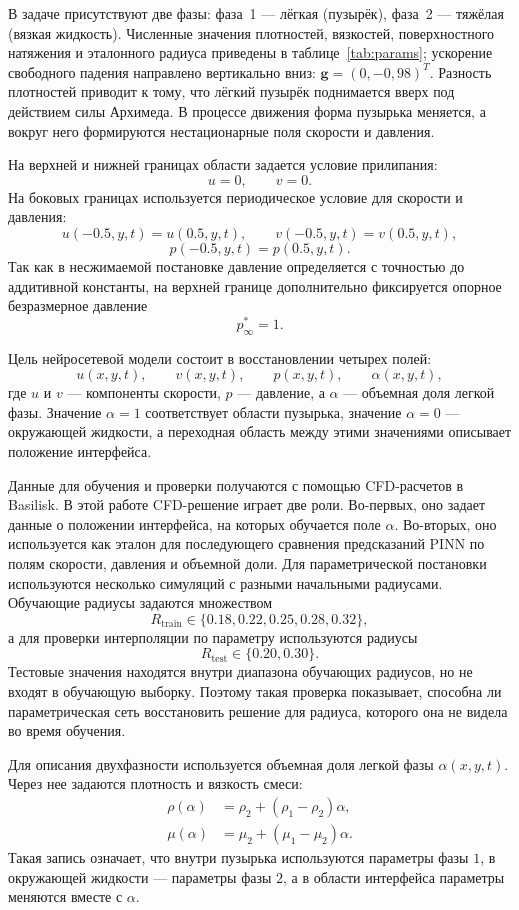 \documentclass[12pt,a4paper]{article}
\begin{document}
В задаче присутствуют две фазы: фаза~1 --- лёгкая (пузырёк), фаза~2 --- тяжёлая
(вязкая жидкость). Численные значения плотностей, вязкостей, поверхностного
натяжения и эталонного радиуса приведены в таблице~\ref{tab:params};
ускорение свободного падения направлено вертикально вниз:
$\mathbf{g}=(0,{-}0{,}98)^T$.
Разность плотностей приводит к тому, что лёгкий пузырёк поднимается вверх под
действием силы Архимеда. В процессе движения форма пузырька меняется, а вокруг
него формируются нестационарные поля скорости и давления.

На верхней и нижней границах области задается условие прилипания:
\[
    u=0,\qquad v=0.
\]
На боковых границах используется периодическое условие для скорости и давления:
\[
    u(-0.5,y,t)=u(0.5,y,t),
    \qquad
    v(-0.5,y,t)=v(0.5,y,t),
\]
\[
    p(-0.5,y,t)=p(0.5,y,t).
\]
Так как в несжимаемой постановке давление определяется с точностью до
аддитивной константы, на верхней границе дополнительно фиксируется опорное
безразмерное давление
\[
    p_\infty^*=1.
\]

Цель нейросетевой модели состоит в восстановлении четырех полей:
\[
    u(x,y,t),\qquad v(x,y,t),\qquad p(x,y,t),\qquad \alpha(x,y,t),
\]
где \(u\) и \(v\) --- компоненты скорости, \(p\) --- давление, а \(\alpha\) ---
объемная доля легкой фазы. Значение \(\alpha=1\) соответствует области
пузырька, значение \(\alpha=0\) --- окружающей жидкости, а переходная область
между этими значениями описывает положение интерфейса.

Данные для обучения и проверки получаются с помощью CFD-расчетов в Basilisk.
В этой работе CFD-решение играет две роли. Во-первых, оно задает данные о
положении интерфейса, на которых обучается поле \(\alpha\). Во-вторых, оно
используется как эталон для последующего сравнения предсказаний PINN по полям
скорости, давления и объемной доли. Для параметрической постановки используются
несколько симуляций с разными начальными радиусами. Обучающие радиусы задаются
множеством
\[
    R_{\mathrm{train}}\in\{0.18,0.22,0.25,0.28,0.32\},
\]
а для проверки интерполяции по параметру используются радиусы
\[
    R_{\mathrm{test}}\in\{0.20,0.30\}.
\]
Тестовые значения находятся внутри диапазона обучающих радиусов, но не входят в
обучающую выборку. Поэтому такая проверка показывает, способна ли
параметрическая сеть восстановить решение для радиуса, которого она не видела
во время обучения.

Для описания двухфазности используется объемная доля легкой фазы
\(\alpha(x,y,t)\). Через нее задаются плотность и вязкость смеси:
\begin{align}
    \rho(\alpha) &= \rho_2 + (\rho_1-\rho_2)\alpha, \\
    \mu(\alpha) &= \mu_2 + (\mu_1-\mu_2)\alpha.
    \label{eq:chapter2_rho_mu}
\end{align}
Такая запись означает, что внутри пузырька используются параметры фазы \(1\), в
окружающей жидкости --- параметры фазы \(2\), а в области интерфейса параметры
меняются вместе с \(\alpha\).
\end{document}
